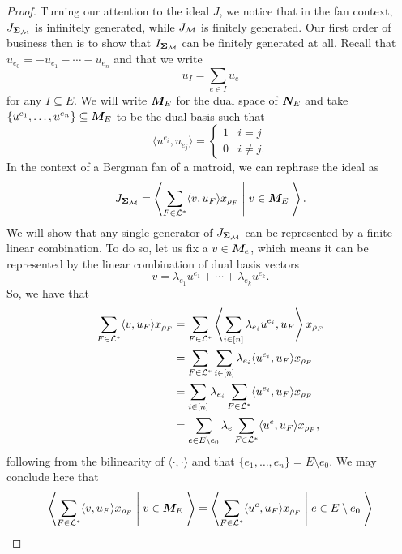 \documentclass[12pt,oneside]{../../sfsuthesis}
\begin{document}
\begin{proof}
    Turning our attention to the ideal \( J \), we notice that in the fan context, \( J_{{\bm{\Sigma}}_{\mathcal{M}}} \) is infinitely generated, while \( J_{\mathcal{M}} \) is finitely generated.
    Our first order of business then is to show that \( I_{{\bm{\Sigma}}_{\mathcal{M}}} \) can be finitely generated at all.
    Recall that \( u_{e_0} = - u_{e_1} - \cdots - u_{e_n} \) and that we write
    \[
        u_I = \sum_{e \in I} u_e
    \]
    for any \( I \subseteq E \).
    We will write \( \bm{M}_E \) for the dual space of \( \bm{N}_E \) and take \( \{ u^{e_1}, \dots, u^{e_n} \} \subseteq \bm{M}_E \) to be the dual basis such that
    \[
        \langle u^{e_i}, u_{e_j} \rangle =
        \begin{cases}
            1 & i = j     \\
            0 & i \neq j.
        \end{cases}
    \]
    In the context of a Bergman fan of a matroid, we can rephrase the ideal as
    \[
        J_{{\bm{\Sigma}}_{\mathcal{M}}} = \left\langle \sum_{F \in \mathcal{L}^\ast} \langle v, u_F \rangle x_{\rho_F} \; \middle| \; v \in \bm{M}_E  \; \right\rangle.
    \]
    We will show that any single generator of \( J_{{\bm{\Sigma}}_{\mathcal{M}}} \) can be represented by a finite linear combination.
    To do so, let us fix a \( v \in \bm{M}_e \), which means it can be represented by the linear combination of dual basis vectors
    \[
        v = \lambda_{e_1} u^{e_1} + \cdots + \lambda_{e_k} u^{e_k}.
    \]
    So, we have that
    \begin{align*}
        \sum_{F \in \mathcal{L}^\ast} \langle v, u_F \rangle x_{\rho_F} & =  \sum_{F \in \mathcal{L}^\ast} \left\langle \sum_{i \in [n]}\lambda_{e_i} u^{e_i}, u_F \right\rangle x_{\rho_F} \\
                                                                & =  \sum_{F \in \mathcal{L}^\ast} \sum_{i \in [n]} \lambda_{e_i} \langle u^{e_i}, u_F \rangle x_{\rho_F}           \\
                                                                & =  \sum_{i \in [n]} \lambda_{e_i} \sum_{F \in \mathcal{L}^\ast} \langle u^{e_i}, u_F \rangle x_{\rho_F}           \\
                                                                & =  \sum_{e \in E \setminus e_0} \lambda_{e} \sum_{F \in \mathcal{L}^\ast} \langle u^{e}, u_F \rangle x_{\rho_F},
    \end{align*}
    following from the bilinearity of \( \langle \cdot, \cdot \rangle \) and that \( \{ e_1, \dots, e_n \} = E \setminus e_0 \).
    We may conclude here that
    \[
        \left\langle \sum_{F \in \mathcal{L}^\ast} \langle v, u_F \rangle x_{\rho_F} \; \middle| \; v \in \bm{M}_E  \; \right\rangle = \left\langle \sum_{F \in \mathcal{L}^\ast} \langle u^e, u_F \rangle x_{\rho_F} \; \middle| \; e \in E \setminus e_0  \; \right\rangle
\]
\end{proof}
\end{document}
